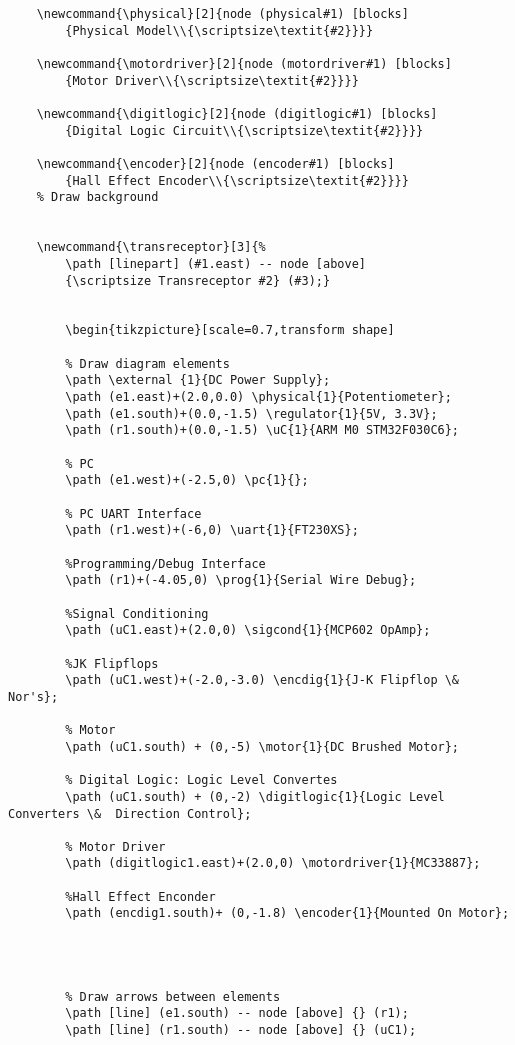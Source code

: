 \begin{verbatim}
	\newcommand{\physical}[2]{node (physical#1) [blocks]
		{Physical Model\\{\scriptsize\textit{#2}}}}
	
	\newcommand{\motordriver}[2]{node (motordriver#1) [blocks]
		{Motor Driver\\{\scriptsize\textit{#2}}}}
	
	\newcommand{\digitlogic}[2]{node (digitlogic#1) [blocks]
		{Digital Logic Circuit\\{\scriptsize\textit{#2}}}}
	
	\newcommand{\encoder}[2]{node (encoder#1) [blocks]
		{Hall Effect Encoder\\{\scriptsize\textit{#2}}}}
	% Draw background
	
	
	\newcommand{\transreceptor}[3]{%
		\path [linepart] (#1.east) -- node [above]
		{\scriptsize Transreceptor #2} (#3);}
	
	
		\begin{tikzpicture}[scale=0.7,transform shape]
		
		% Draw diagram elements
		\path \external {1}{DC Power Supply};
		\path (e1.east)+(2.0,0.0) \physical{1}{Potentiometer};
		\path (e1.south)+(0.0,-1.5) \regulator{1}{5V, 3.3V};
		\path (r1.south)+(0.0,-1.5) \uC{1}{ARM M0 STM32F030C6};
		
		% PC 
		\path (e1.west)+(-2.5,0) \pc{1}{};
		
		% PC UART Interface
		\path (r1.west)+(-6,0) \uart{1}{FT230XS};
		
		%Programming/Debug Interface
		\path (r1)+(-4.05,0) \prog{1}{Serial Wire Debug};
		
		%Signal Conditioning
		\path (uC1.east)+(2.0,0) \sigcond{1}{MCP602 OpAmp};
		
		%JK Flipflops
		\path (uC1.west)+(-2.0,-3.0) \encdig{1}{J-K Flipflop \& Nor's};
		
		% Motor
		\path (uC1.south) + (0,-5) \motor{1}{DC Brushed Motor};
		
		% Digital Logic: Logic Level Convertes
		\path (uC1.south) + (0,-2) \digitlogic{1}{Logic Level Converters \&  Direction Control};
		
		% Motor Driver
		\path (digitlogic1.east)+(2.0,0) \motordriver{1}{MC33887};
		
		%Hall Effect Enconder
		\path (encdig1.south)+ (0,-1.8) \encoder{1}{Mounted On Motor};
		
		
		
		
		% Draw arrows between elements
		\path [line] (e1.south) -- node [above] {} (r1);
		\path [line] (r1.south) -- node [above] {} (uC1);
		

\end{verbatim}
